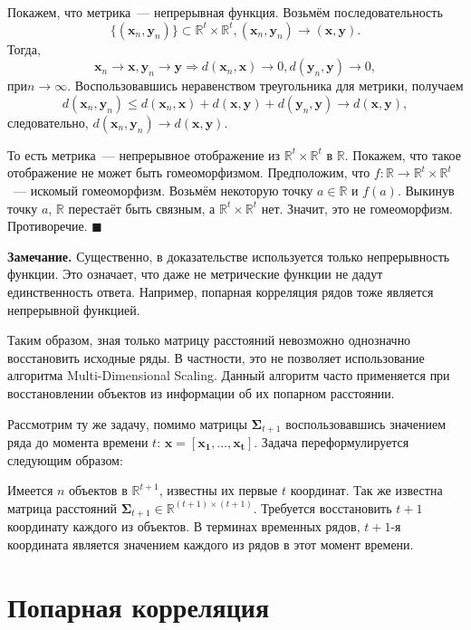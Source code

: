 \documentclass{article}
\begin{document}
Покажем, что метрика~--- непрерывная функция. Возьмём последовательность \[\{(\mathbf{x}_n, \mathbf{y}_n)\} \subset \mathbb{R}^t \times \mathbb{R}^t, (\mathbf{x}_n, \mathbf{y}_n) \to (\mathbf{x}, \mathbf{y}).\] Тогда, \[\mathbf{x}_n\to \mathbf{x}, \mathbf{y}_n\to \mathbf{y} \Rightarrow d(\mathbf{x}_n,\mathbf{x})\to 0 ,d(\mathbf{y}_n,\mathbf{y})\to 0,\] $при n \to \infty.$ Воспользовавшись неравенством треугольника для метрики, получаем \[d(\mathbf{x}_n,\mathbf{y}_n)\leqslant d(\mathbf{x}_n,\mathbf{x})+d(\mathbf{x},\mathbf{y})+d(\mathbf{y}_n,\mathbf{y})\to d(\mathbf{x},\mathbf{y}),\] следовательно, $d(\mathbf{x}_n,\mathbf{y}_n)\to d(\mathbf{x},\mathbf{y})$.

То есть метрика~--- непрерывное отображение из $\mathbb{R}^t \times \mathbb{R}^t$ в $\mathbb{R}$. Покажем, что такое отображение не может быть гомеоморфизмом. Предположим, что $f: \mathbb{R} \to \mathbb{R}^t \times \mathbb{R}^t$~--- искомый гомеоморфизм. Возьмём некоторую точку $a \in \mathbb{R}$ и $f(a)$. Выкинув точку $a$, $\mathbb{R}$ перестаёт быть связным, а $\mathbb{R}^t \times \mathbb{R}^t$ нет. Значит, это не гомеоморфизм. Противоречие.
$\blacksquare$

\textbf{Замечание.} Существенно, в доказательстве используется только непрерывность функции. Это означает, что даже не метрические функции не дадут единственность ответа. Например, попарная корреляция рядов тоже является непрерывной функцией.

Таким образом, зная только матрицу расстояний невозможно однозначно восстановить исходные ряды. В частности, это не позволяет использование алгоритма Multi-Dimensional Scaling. Данный алгоритм часто применяется при восстановлении объектов из информации об их попарном расстоянии.

Рассмотрим ту же задачу, помимо матрицы $\mathbf{\Sigma}_{t+1}$ воспользовавшись значением ряда до момента времени $t$: $\mathbf{x}=[\mathbf{x_1}, \ldots, \mathbf{x_{t}}]$. Задача переформулируется следующим образом:

Имеется $n$ объектов в $\mathbb{R}^{t+1}$, известны их первые $t$ координат. Так же известна матрица расстояний $\mathbf{\Sigma}_{t+1} \in \mathbb{R}^{(t+1) \times (t+1)}$. Требуется восстановить $t+1$ координату каждого из объектов. В терминах временных рядов, $t+1$-я координата является значением каждого из рядов в этот момент времени.

\section{Попарная корреляция}
\end{document}
